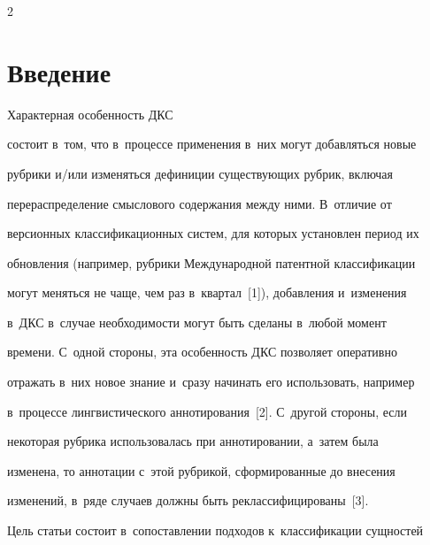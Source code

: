 




\thispagestyle{headings}





\begin{multicols}{2}





\label{st\stat}


     


\section{Введение}





Характерная особенность ДКС 


состоит в~том, что в~процессе применения в~них могут добавляться новые 


рубрики и/или изменяться дефиниции существующих рубрик, включая 


перераспределение смыслового содержания между ними. В~отличие от 


версионных классификационных систем, для которых установлен период их 


обновления (например, рубрики Международной патентной классификации 


могут меняться не чаще, чем раз в~квартал~[1]), добавления и~изменения 


в~ДКС в~случае необходимости могут быть сделаны в~любой момент 


времени. С~одной стороны, эта особенность ДКС позволяет оперативно 


отражать в~них новое знание и~сразу начинать его использовать, например 


в~процессе лингвистического аннотирования~[2]. С~другой стороны, если 


некоторая рубрика использовалась при аннотировании, а~затем была 


изменена, то аннотации с~этой рубрикой, сформированные до внесения 


изменений, в~ряде случаев должны быть реклассифицированы~[3].





Цель статьи состоит в~сопоставлении подходов к~классификации сущностей 



\end{multicols}
